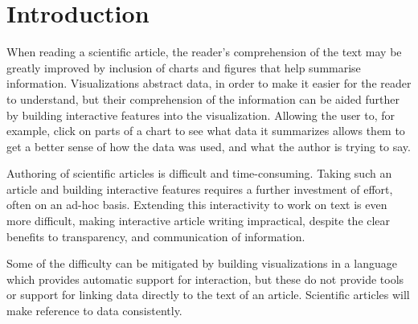 \section{Introduction}

When reading a scientific article, the reader's comprehension of the text may
be greatly improved by inclusion of charts and figures that help summarise information.
Visualizations abstract data, in order to make it easier for the reader to understand,
but their comprehension of the information can be aided further by building interactive
features into the visualization. Allowing the user to, for example, click on parts
of a chart to see what data it summarizes allows them to get a better sense of
how the data was used, and what the author is trying to say.

Authoring of scientific articles is difficult and time-consuming. Taking such
an article and building interactive features requires a further investment of
effort, often on an ad-hoc basis. Extending this interactivity to work on text
is even more difficult, making interactive article writing impractical, despite
the clear benefits to transparency, and communication of information.

Some of the difficulty can be mitigated by building visualizations in a language
which provides automatic support for interaction, but these do not provide tools
or support for linking data directly to the text of an article. Scientific articles
will make reference to data consistently.